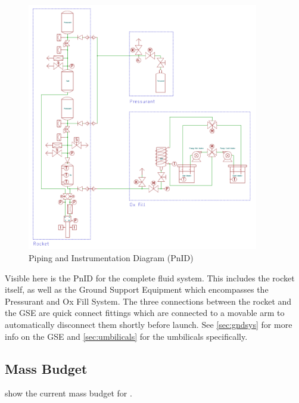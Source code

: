 \begin{figure}
    \centering
    \includegraphics[width=0.9\textwidth]{SysArch/uHoubolt_complete_PnID.pdf}
    \caption{\uH Piping and Instrumentation Diagram (PnID)}
    \label{fig:full_pnid}
\end{figure}

Visible here is the PnID for the complete fluid system. This includes the rocket itself, as well as the Ground Support Equipment which encompasses the Pressurant and Ox Fill System. The three connections between the rocket and the GSE are quick connect fittings which are connected to a movable arm  to automatically disconnect them shortly before launch. See \cref{sec:gndsys} for more info on the GSE and \cref{sec:umbilicals} for the umbilicals specifically.

\subsection{Mass Budget}
 show the current mass budget for \uH.


